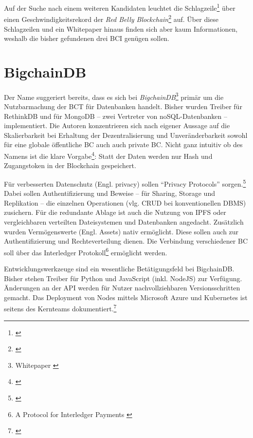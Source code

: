 Auf der Suche nach einem weiteren Kandidaten leuchtet die Schlagzeile\footnote{\autocite{w:rebealley:sydney}} über einen Geschwindigkeitsrekord der \emph{Red Belly Blockchain}\footnote{\autocite{p:rbbc}} auf.
Über diese Schlagzeilen und ein Whitepaper hinaus finden sich aber kaum Informationen, weshalb die bisher gefundenen drei \gls{BCI} genügen sollen.

\section{BigchainDB}

Der Name suggeriert bereits, dass es sich bei \emph{BigchainDB}\footnote{Whitepaper \autocite{p:bigchaindb}} primär um die Nutzbarmachung der \gls{BCT} für Datenbanken handelt.
Bisher wurden Treiber für RethinkDB und für MongoDB -- zwei Vertreter von noSQL-Datenbanken -- implementiert. Die Autoren konzentrieren sich nach eigener Aussage auf die Skalierbarkeit bei Erhaltung der Dezentralisierung und Unveränderbarkeit sowohl für eine globale öffentliche \gls{BC} auch auch private \gls{BC}.
Nicht ganz intuitiv ob des Namens ist die klare Vorgabe\footnote{\autocite{w:bcdb:features}}: Statt der Daten werden nur Hash und Zugangstoken in der Blockchain gespeichert.

Für verbesserten Datenschutz (Engl. privacy)
sollen \enquote{Privacy Protocols} sorgen.\footnote{\cite{w:github-bigchaindb-pp}}
Dabei sollen Authentifizierung und Beweise -- für \ua{} Sharing, Storage und Replikation -- die einzelnen Operationen (vlg. CRUD bei konventionellen DBMS) zusichern.
Für die redundante Ablage ist auch die Nutzung von \gls{IPFS} oder vergleichbaren verteilten Dateisystemen und Datenbanken angedacht.
Zusätzlich wurden Vermögenswerte (Engl. Assets) nativ ermöglicht.
Diese sollen auch zur Authentifizierung und Rechteverteilung dienen.
Die Verbindung verschiedener \gls{BC} soll \zB{} über das Interledger Protokoll\footnote{A Protocol for Interledger Payments \autocite{p:interledger}}\label{first:interledger} ermöglicht werden.

Entwicklungswerkzeuge sind ein wesentliche Betätigungsfeld bei BigchainDB.
Bisher stehen Treiber für Python und JavaScript (inkl. NodeJS) zur Verfügung.
Änderungen an der API werden für Nutzer nachvollziehbaren Versionsschritten gemacht.
Das Deployment von Nodes mittels Microsoft Azure und Kubernetes ist seitens des Kernteams dokumentiert.\footnote{\cite{w:bigchaindb-proddepl}}

